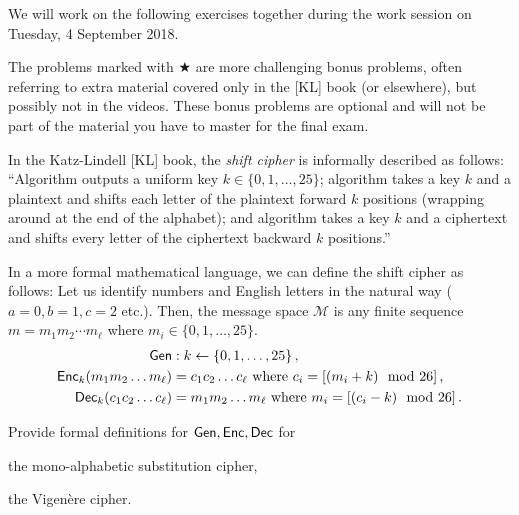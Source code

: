 \documentclass[a4paper,10pt,landscape,twocolumn]{scrartcl}
\begin{document}
\problems

{\sffamily\noindent
We will work on the following exercises together during the work session on Tuesday, 4 September 2018.

The problems marked with $\bigstar$ are more challenging bonus problems, often referring to extra material covered only in the [KL] book (or elsewhere), but possibly not in the videos. These bonus problems are optional and will not be part of the material you have to master for the final exam. 
}

\begin{exercise}
In the Katz-Lindell [KL] book, the \emph{shift cipher} is informally described as follows: ``Algorithm \gen outputs a uniform key $k \in \{0,1,\ldots, 25\}$; algorithm \enc takes a key $k$ and a plaintext and shifts each letter of the plaintext forward $k$ positions (wrapping around at the end of the alphabet); and algorithm \dec takes a key $k$ and a ciphertext and shifts every letter of the ciphertext backward $k$ positions.''

In a more formal mathematical language, we can define the shift cipher as follows: Let us identify numbers and English letters in the natural way ($a=0, b=1, c=2$ etc.). Then, the message space $\mathcal{M}$ is any finite sequence $m=m_1 m_2 \cdots m_\ell$ where $m_i \in \{0,1,\ldots,25\}$.
\begin{align*}
\mathsf{Gen}&: k \leftarrow \{0,1,\ldots, 25\} \, ,\\
\mathsf{Enc}_k(m_1 m_2 \ldots m_\ell) &= c_1 c_2 \ldots c_\ell  \mbox{ where }c_i = [(m_i + k) \mod 26] \, ,\\
\mathsf{Dec}_k(c_1 c_2 \ldots c_\ell) &= m_1 m_2 \ldots m_\ell  \mbox{ where }m_i = [(c_i - k) \mod 26] \, .
\end{align*}

Provide formal definitions for $\mathsf{Gen}, \mathsf{Enc}, \mathsf{Dec}$ for 
\begin{subex}
the mono-alphabetic substitution cipher,
\end{subex}
\begin{subex}
the Vigen{\`e}re cipher.
\end{subex}
\end{exercise}
\end{document}

